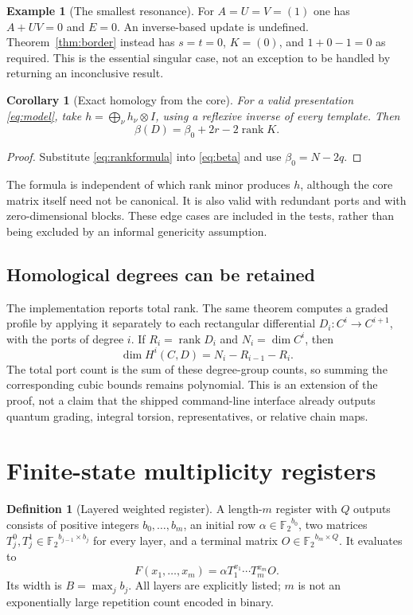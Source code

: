 \documentclass[11pt,letterpaper]{article}
\newcommand{\F}{{\mathbb F_2}}
\newcommand{\rk}{\operatorname{rank}}
\newtheorem{corollary}[theorem]{Corollary}
\theoremstyle{definition}
\newtheorem{definition}[theorem]{Definition}
\newtheorem{example}[theorem]{Example}
\theoremstyle{remark}
\numberwithin{equation}{section}
\begin{document}
\begin{example}[The smallest resonance]
For $A=U=V=(1)$ one has $A+UV=0$ and $E=0$. An inverse-based update is
undefined. Theorem~\ref{thm:border} instead has $s=t=0$, $K=(0)$, and
$1+0-1=0$ as required. This is the essential singular case, not an
exception to be handled by returning an inconclusive result.
\end{example}

\begin{corollary}[Exact homology from the core]
\label{cor:homology}
For a valid presentation \eqref{eq:model}, take
$h=\bigoplus_\nu h_\nu\otimes I$, using a reflexive inverse of every
template. Then
\begin{equation}
 \boxed{\beta(D)=\beta_0+2r-2\rk K.}
 \label{eq:homologycore}
\end{equation}
\end{corollary}
\begin{proof}
Substitute \eqref{eq:rankformula} into \eqref{eq:beta} and use
$\beta_0=N-2q$.
\end{proof}

The formula is independent of which rank minor produces $h$, although the
core matrix itself need not be canonical. It is also valid with redundant
ports and with zero-dimensional blocks. These edge cases are included in
the tests, rather than being excluded by an informal genericity assumption.

\subsection{Homological degrees can be retained}
The implementation reports total rank. The same theorem computes a graded
profile by applying it separately to each rectangular differential
$D_i:C^i\to C^{i+1}$, with the ports of degree $i$. If $R_i=\rk D_i$ and
$N_i=\dim C^i$, then
\[
 \dim H^i(C,D)=N_i-R_{i-1}-R_i.
\]
The total port count is the sum of these degree-group counts, so summing
the corresponding cubic bounds remains polynomial. This is an extension
of the proof, not a claim that the shipped command-line interface already
outputs quantum grading, integral torsion, representatives, or relative
chain maps.

\section{Finite-state multiplicity registers}
\label{sec:register}

\begin{definition}[Layered weighted register]
A length-$m$ register with $Q$ outputs consists of positive integers
$b_0,\ldots,b_m$, an initial row $\alpha\in\F^{b_0}$, two matrices
$T_j^0,T_j^1\in\F^{b_{j-1}\times b_j}$ for every layer, and a terminal
matrix $O\in\F^{b_m\times Q}$. It evaluates to
\begin{equation}
 F(x_1,\ldots,x_m)=\alpha T_1^{x_1}\cdots T_m^{x_m}O.
 \label{eq:register}
\end{equation}
Its width is $B=\max_j b_j$. All layers are explicitly listed; $m$ is not
an exponentially large repetition count encoded in binary.
\end{definition}
\end{document}
